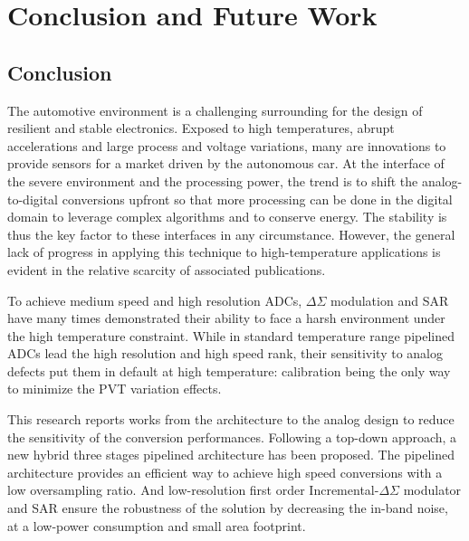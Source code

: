 \chapter{Conclusion and Future Work}
\label{sec:perspectives}
\ifpdf
    \graphicspath{{Chapter6/Figs/Raster/}{Chapter6/Figs/PDF/}{Chapter6/Figs/}}
\else
    \graphicspath{{Chapter6/Figs/Vector/}{Chapter6/Figs/}}
\fi 

\section{Conclusion}           %
The automotive environment is a challenging surrounding for the design of resilient and stable electronics. Exposed to high temperatures, abrupt accelerations and large process and voltage variations, many are innovations to provide sensors for a market driven by the autonomous car. At the interface of the severe environment and the processing power, the trend is to shift the analog-to-digital conversions upfront so that more processing can be done in the digital domain to leverage complex algorithms and to conserve energy. The stability is thus the key factor to these interfaces in any circumstance. However, the general lack of progress in applying this technique to high-temperature applications is evident in the relative scarcity of associated publications.

To achieve medium speed and high resolution ADCs, \(\Delta \Sigma \) modulation and SAR have many times demonstrated their ability to face a harsh environment under the high temperature constraint. While in standard temperature range pipelined ADCs lead the high resolution and high speed rank, their sensitivity to analog defects put them in default at high temperature: calibration being the only way to minimize the PVT variation effects.

This research reports works from the architecture to the analog design to reduce the sensitivity of the conversion performances. Following a top-down approach, a new hybrid three stages pipelined architecture has been proposed. The pipelined architecture provides an efficient way to achieve high speed conversions with a low oversampling ratio. And low-resolution first order Incremental-\(\Delta \Sigma \) modulator and SAR ensure the robustness of the solution by decreasing the in-band noise, at a low-power consumption and small area footprint. 

